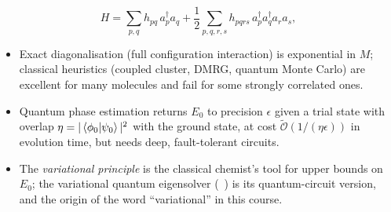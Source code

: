 \documentclass[overheadsbeamer.tex]{subfiles}
\begin{document}
\begin{frame}
\begin{equation}\label{eq:ch01:molH}
    H = \sum_{p,q} h_{pq}\,a_p^\dagger a_q + \frac12\sum_{p,q,r,s} h_{pqrs}\,a_p^\dagger a_q^\dagger a_r a_s,
\end{equation}
\begin{itemize}\setlength\itemsep{0.2em}
    \item Exact diagonalisation (full configuration interaction) is exponential in $M$; classical heuristics (coupled cluster, DMRG, quantum Monte Carlo) are excellent for many molecules and fail for some strongly correlated ones.
    \item Quantum phase estimation returns $E_0$ to precision $\epsilon$ given a trial state with overlap $\eta = |\braket{\phi_0|\psi_0}|^2$ with the ground state, at cost $\widetilde{\mathcal O}(1/(\eta\epsilon))$ in evolution time, but needs deep, fault-tolerant circuits.
    \item The \emph{variational principle} is the classical chemist's tool for upper bounds on $E_0$; the variational quantum eigensolver (\Chap~) is its quantum-circuit version, and the origin of the word ``variational'' in this course.
\end{itemize}
\end{frame}
\end{document}
